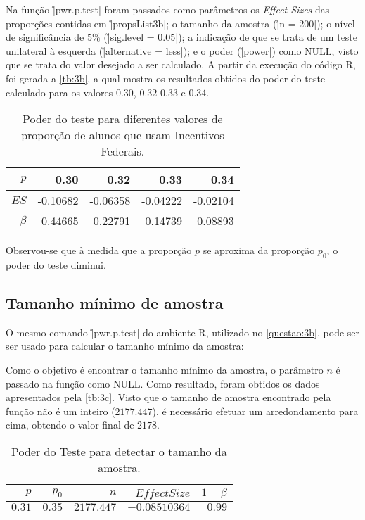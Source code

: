 
Na função \r|pwr.p.test| foram passados como parâmetros os \textit{Effect Sizes} das proporções contidas em \r|propsList3b|;
o tamanho da amostra (\r|n = 200|); 
o nível de significância de $5\%$ (\r|sig.level = 0.05|);
a indicação de que se trata de um teste unilateral à esquerda (\r|alternative = less|); 
e o poder (\r|power|) como NULL, visto que se trata do valor desejado a ser calculado.
A partir da execução do código R, foi gerada a \autoref{tb:3b}, a qual mostra os resultados obtidos do poder do teste calculado para os valores $0.30$, $0.32$ $0.33$ e $0.34$.

\begin{table}[ht]
\centering
\caption{Poder do teste para diferentes valores de proporção de alunos que usam Incentivos Federais.} 
\label{tb:3b}
\begin{tabular}{rrrrr}
  \toprule
 $p$ & 0.30 & 0.32 & 0.33 & 0.34 \\ 
  \midrule
$ES$ 	& -0.10682 & -0.06358 & -0.04222 & -0.02104 \\ 
$\beta$ & 0.44665   & 0.22791   & 0.14739   & 0.08893  \\ 
   \bottomrule
\end{tabular}
\end{table}

Observou-se que à medida que a proporção $p$ se aproxima da proporção $p_0$, o poder do teste diminui.


\subsection{Tamanho mínimo de amostra}
\label{questao:3c}
O mesmo comando \r|pwr.p.test| do ambiente R, utilizado no \autoref{questao:3b}, pode ser ser usado para calcular o tamanho mínimo da amostra: 


Como o objetivo é encontrar o tamanho mínimo da amostra, o parâmetro $n$ é passado na função como NULL.
Como resultado, foram obtidos os dados apresentados pela \autoref{tb:3c}. 
Visto que o tamanho de amostra encontrado pela função não é um inteiro ($2177.447$), é necessário efetuar um arredondamento para cima, obtendo o valor final de $2178$.

\begin{table}[ht]
\centering
\caption{Poder do Teste para detectar o tamanho da amostra.} 
\label{tb:3c}
\begin{tabular}{rrrrr}
  \toprule
 $p$ & $p_0$ & $n$ & $Effect Size$ & $1 - \beta$ \\ 
  \midrule
  $0.31$ & $0.35$ & $2177.447$ & $-0.08510364$ & $0.99$ \\ 
   \bottomrule
\end{tabular}
\end{table}

